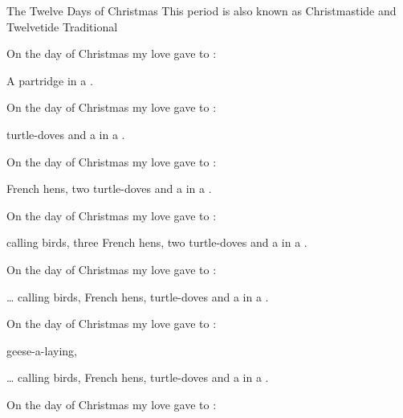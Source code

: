 \begin{SBSong}{The Twelve Days of Christmas}
  {This period is also known as Christmastide and Twelvetide}
  {Traditional}
  \begin{SBVerse}
	On the  day of Christmas my  love gave to :

	A partridge in a  .
  \end{SBVerse}
  \begin{SBVerse}
	On the  day of Christmas my  love gave to :

	 turtle-doves and a  in a  .
  \end{SBVerse}
  \begin{SBVerse}
	On the  day of Christmas my  love gave to :

	 French hens, 
	two turtle-doves 
    and a  in a  .
  \end{SBVerse}
  \begin{SBVerse}
	On the  day of Christmas my  love gave to :

	 calling birds, 
	three French hens, 
	two turtle-doves 
    and a  in a  .
  \end{SBVerse}
  
  \begin{SBVerse}
	On the  day of Christmas my  love gave to :

	  \ldots 
	 calling birds, 
	 French hens, 
	 turtle-doves 
    and a  in a  .
  \end{SBVerse}
  \begin{SBVerse}
	On the  day of Christmas my  love gave to :

	 geese-a-laying,
	
	  \ldots 
	 calling birds, 
	 French hens, 
	 turtle-doves 
    and a  in a  .
  \end{SBVerse}
  \begin{SBVerse}
	On the  day of Christmas my  love gave to :


\end{SBVerse}
\end{SBSong}
